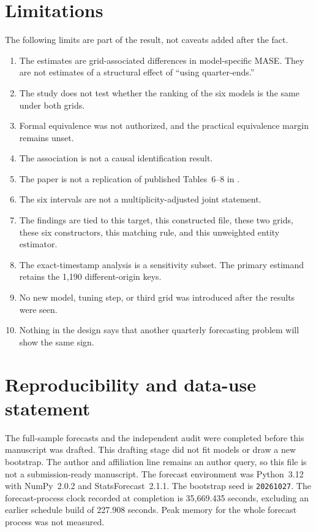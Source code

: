 \documentclass[11pt]{article}
\begin{document}
\section{Limitations}
\label{sec:limitations}

The following limits are part of the result, not caveats added after the fact.

\begin{enumerate}
\item The estimates are grid-associated differences in model-specific MASE. They are not estimates of a structural effect of ``using quarter-ends.''
\item The study does not test whether the ranking of the six models is the same under both grids.
\item Formal equivalence was not authorized, and the practical equivalence margin remains unset.
\item The association is not a causal identification result.
\item The paper is not a replication of published Tables~6--8 in \citet{bejarano2026ofr}.
\item The six intervals are not a multiplicity-adjusted joint statement.
\item The findings are tied to this target, this constructed file, these two grids, these six constructors, this matching rule, and this unweighted entity estimator.
\item The exact-timestamp analysis is a sensitivity subset. The primary estimand retains the 1{,}190 different-origin keys.
\item No new model, tuning step, or third grid was introduced after the results were seen.
\item Nothing in the design says that another quarterly forecasting problem will show the same sign.
\end{enumerate}

\section{Reproducibility and data-use statement}
\label{sec:reproducibility}

The full-sample forecasts and the independent audit were completed before this manuscript was drafted. This drafting stage did not fit models or draw a new bootstrap. The author and affiliation line remains an author query, so this file is not a submission-ready manuscript. The forecast environment was Python~3.12 with NumPy~2.0.2 and StatsForecast~2.1.1. The bootstrap seed is \texttt{20261027}. The forecast-process clock recorded at completion is 35{,}669.435 seconds, excluding an earlier schedule build of 227.908 seconds. Peak memory for the whole forecast process was not measured.
\end{document}
